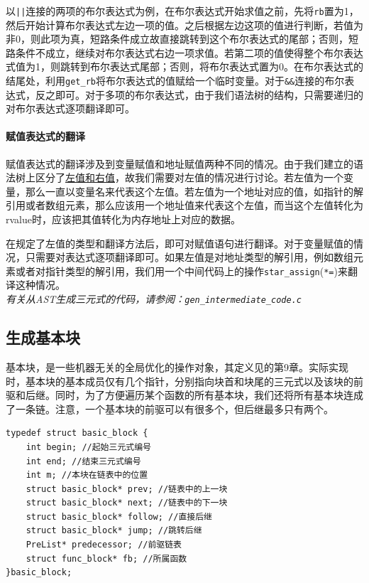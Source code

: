 以\verb+||+连接的两项的布尔表达式为例，在布尔表达式开始求值之前，先将\verb|rb|置为1，然后开始计算布尔表达式左边一项的值。之后根据左边这项的值进行判断，若值为非0，则此项为真，短路条件成立故直接跳转到这个布尔表达式的尾部；否则，短路条件不成立，继续对布尔表达式右边一项求值。若第二项的值使得整个布尔表达式值为1，则跳转到布尔表达式尾部；否则，将布尔表达式置为0。在布尔表达式的结尾处，利用\verb|get_rb|将布尔表达式的值赋给一个临时变量。对于\verb|&&|连接的布尔表达式，反之即可。对于多项的布尔表达式，由于我们语法树的结构，只需要递归的对布尔表达式逐项翻译即可。

\paragraph*{赋值表达式的翻译}
赋值表达式的翻译涉及到变量赋值和地址赋值两种不同的情况。由于我们建立的语法树上区分了\hyperref[lrvalue]{左值和右值}，故我们需要对左值的情况进行讨论。若左值为一个变量，那么一直以变量名来代表这个左值。若左值为一个地址对应的值，如指针的解引用或者数组元素，那么应该用一个地址值来代表这个左值，而当这个左值转化为rvalue时，应该把其值转化为内存地址上对应的数据。

在规定了左值的类型和翻译方法后，即可对赋值语句进行翻译。对于变量赋值的情况，只需要对表达式逐项翻译即可。如果左值是对地址类型的解引用，例如数组元素或者对指针类型的解引用，我们用一个中间代码上的操作\verb|star_assign|(\verb|*=|)来翻译这种情况。\\
{\it \anchor 有关从AST生成三元式的代码，请参阅：\verb|gen_intermediate_code.c|}\\
\subsection{生成基本块}
\label{basicblock}
基本块，是一些机器无关的全局优化的操作对象，其定义见\cite{sunjiasu}的第9章。实际实现时，基本块的基本成员仅有几个指针，分别指向块首和块尾的三元式以及该块的前驱和后继。同时，为了方便遍历某个函数的所有基本块，我们还将所有基本块连成了一条链。注意，一个基本块的前驱可以有很多个，但后继最多只有两个。
\begin{lstlisting}
typedef struct basic_block {
	int begin; //起始三元式编号
	int end; //结束三元式编号
	int m; //本块在链表中的位置
	struct basic_block* prev; //链表中的上一块
	struct basic_block* next; //链表中的下一块
	struct basic_block* follow; //直接后继
	struct basic_block* jump; //跳转后继
	PreList* predecessor; //前驱链表
	struct func_block* fb; //所属函数
}basic_block;
\end{lstlisting}

